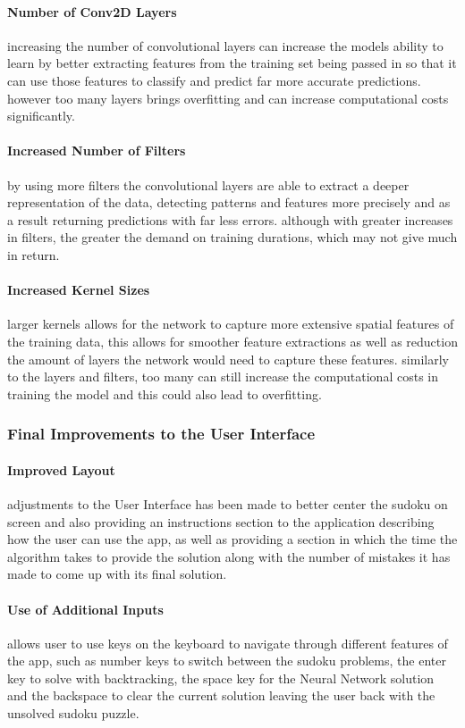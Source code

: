 \documentclass[]{final_report}
\begin{document}
\paragraph{Number of Conv2D Layers}
increasing the number of convolutional layers can increase the models ability to learn by better extracting features from the training set being passed in so that it can use those features to classify and predict far more accurate predictions. however too many layers brings overfitting and can increase computational costs significantly.

\paragraph{Increased Number of Filters}
by using more filters the convolutional layers are able to extract a deeper representation of the data, detecting patterns and features more precisely and as a result returning predictions with far less errors. although with greater increases in filters, the greater the demand on training durations, which may not give much in return.

\paragraph{Increased Kernel Sizes}
larger kernels allows for the network to capture more extensive spatial features of the training data, this allows for smoother feature extractions as well as reduction the amount of layers the network would need to capture these features. similarly to the layers and filters, too many can still increase the computational costs in training the model and this could also lead to overfitting.

\subsubsection{Final Improvements to the User Interface}

\paragraph{Improved Layout}
adjustments to the User Interface has been made to better center the sudoku on screen and also providing an instructions section to the application describing how the user can use the app, as well as providing a section in which the time the algorithm takes to provide the solution along with the number of mistakes it has made to come up with its final solution.

\paragraph{Use of Additional Inputs}
allows user to use keys on the keyboard to navigate through different features of the app, such as number keys to switch between the sudoku problems, the enter key to solve with backtracking, the space key for the Neural Network solution and the backspace to clear the current solution leaving the user back with the unsolved sudoku puzzle.
\end{document}
